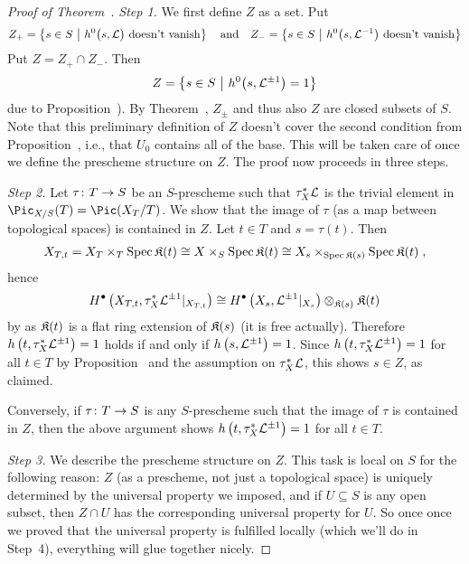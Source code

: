 \documentclass[a4paper,parskip=half,numbers=enddot, DIV=12]{scrreprt}
\begin{document}
\begin{proof}[Proof of Theorem~]
	\emph{Step 1.} We first define $Z$ as a set. Put
	\begin{align*}
		Z_+=\left\{s\in S\ \middle|\  h^0\big(s,\mathcal{L}\big)\text{ doesn't vanish}\right\}\quad\text{and}\quad Z_-=\left\{s\in S\ \middle|\  h^0\big(s,\mathcal{L}^{-1}\big)\text{ doesn't vanish}\right\}
	\end{align*}
	Put $Z=Z_+\cap Z_-$. Then
	\begin{align*}
		Z=\left\{s\in S\ \middle|\  h^0\big(s,\mathcal{L}^{\pm 1}\big)=1\right\}
	\end{align*}
	due to Proposition~). By Theorem~, $Z_\pm$ and thus also $Z$ are closed subsets of $S$. Note that this preliminary definition of $Z$ doesn't cover the second condition from Proposition~, i.e., that $U_0$ contains all of the base. This will be taken care of once we define the prescheme structure on $Z$. The proof now proceeds in three steps.
	
	 \emph{Step 2.} Let $\tau\colon T\morphism S$ be an $S$-prescheme such that $\tau_X^*\mathcal{L}$ is the trivial element in $\Pic_{X/S}(T)=\Pic(X_T/T)$. We show that the image of $\tau$ (as a map between topological spaces) is contained in $Z$.  Let $t\in T$ and $s=\tau(t)$. Then
	\begin{align*}
		X_{T,t}=X_T\times_T\operatorname{Spec}\mathfrak{K}(t)\cong X\times_S\operatorname{Spec}\mathfrak{K}(t)\cong X_s\times_{\operatorname{Spec}\mathfrak{K}(s)}\operatorname{Spec}\mathfrak{K}(t)\;,
	\end{align*}
	hence
	\begin{align*}
		H^\bullet\left(X_{T,t},\tau_X^*\mathcal{L}^{\pm 1}|_{X_{T,t}}\right)\cong H^\bullet\left(X_s,\mathcal{L}^{\pm 1}|_{X_s}\right)\otimes_{\mathfrak{K}(s)}\mathfrak{K}(t)
	\end{align*}
	by  as $\mathfrak{K}(t)$ is a flat ring extension of $\mathfrak{K}(s)$ (it is free actually). Therefore $h\left(t,\tau_X^*\mathcal{L}^{\pm 1}\right)=1$ holds if and only if $h\left(s,\mathcal{L}^{\pm 1}\right)=1$. Since $h\left(t,\tau_X^*\mathcal{L}^{\pm 1}\right)=1$ for all $t\in T$ by Proposition~ and the assumption on $\tau_X^*\mathcal{L}$, this shows $s\in Z$, as claimed.
	
	Conversely, if $\tau\colon T\morphism S$ is any $S$-prescheme such that the image of  $\tau$ is contained in $Z$, then the above argument shows $h\left(t,\tau_X^*\mathcal{L}^{\pm 1}\right)=1$ for all $t\in T$.
	
	\emph{Step 3.} We describe the prescheme structure on $Z$. This task is local on $S$ for the following reason: $Z$ (as a prescheme, not just a topological space) is uniquely determined by the universal property we imposed, and if $U\subseteq S$ is any open subset, then $Z\cap U$ has the corresponding universal property for $U$. So once once we proved that the universal property is fulfilled locally (which we'll do in Step~4), everything will glue together nicely. 
	

\end{proof}
\end{document}
